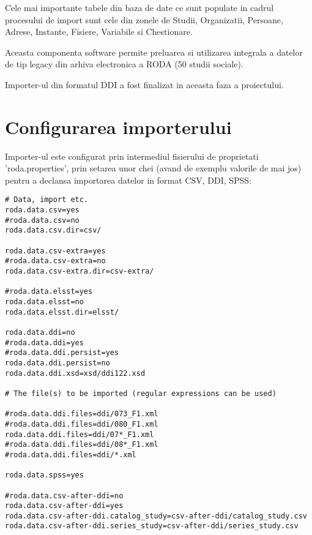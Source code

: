 Cele mai importante tabele din baza de date ce sunt populate in cadrul procesului de import sunt cele din
zonele de Studii, Organizatii, Persoane, Adrese, Instante,  Fisiere, Variabile si Chestionare. 

Aceasta componenta software permite preluarea si utilizarea integrala a datelor de tip legacy din arhiva electronica a RODA (50 studii sociale).

Importer-ul din formatul DDI a fost finalizat in aceasta faza a proiectului.

\section{Configurarea importerului}

Importer-ul este configurat prin intermediul fisierului de proprietati 'roda.properties', prin setarea unor chei (avand de exemplu valorile de mai jos) 
pentru a declansa importarea datelor in format CSV, DDI, SPSS:

\begin{lstlisting}
# Data, import etc.
roda.data.csv=yes
#roda.data.csv=no
roda.data.csv.dir=csv/

roda.data.csv-extra=yes
#roda.data.csv-extra=no
roda.data.csv-extra.dir=csv-extra/

#roda.data.elsst=yes
roda.data.elsst=no
roda.data.elsst.dir=elsst/

roda.data.ddi=no
#roda.data.ddi=yes
#roda.data.ddi.persist=yes
roda.data.ddi.persist=no
roda.data.ddi.xsd=xsd/ddi122.xsd

# The file(s) to be imported (regular expressions can be used)

#roda.data.ddi.files=ddi/073_F1.xml
#roda.data.ddi.files=ddi/080_F1.xml
roda.data.ddi.files=ddi/07*_F1.xml
#roda.data.ddi.files=ddi/08*_F1.xml
#roda.data.ddi.files=ddi/*.xml

roda.data.spss=yes

#roda.data.csv-after-ddi=no
roda.data.csv-after-ddi=yes
roda.data.csv-after-ddi.catalog_study=csv-after-ddi/catalog_study.csv
roda.data.csv-after-ddi.series_study=csv-after-ddi/series_study.csv

\end{lstlisting}